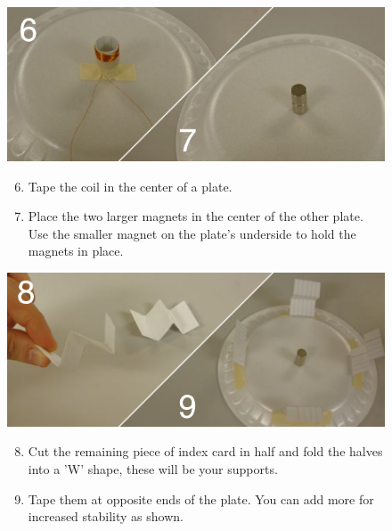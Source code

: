 \documentclass[11pt]{article}
\begin{document}
\begin{figure}[H]
	\begin{minipage}[b]{0.69\linewidth}
		\centering	\includegraphics[width=\textwidth]{images/plates.pdf}
	\end{minipage}
	\hspace{0.1cm}
	\begin{minipage}[b]{0.3\linewidth}
		\begin{enumerate} \setcounter{enumi}{5}
			\item Tape the coil in the center of a plate. 
			\item Place the two larger magnets in the center of the other plate. Use the smaller magnet on the plate's underside to hold 				the magnets in place.			
		\end{enumerate}
	\end{minipage}
\end{figure}

\vspace{1.6cm}

\begin{figure}[H]
	\begin{minipage}[b]{0.69\linewidth}
		\centering	\includegraphics[width=\textwidth]{images/spiders.pdf}
	\end{minipage}
	\hspace{0.1cm}
	\begin{minipage}[b]{0.3\linewidth}
		\begin{enumerate} \setcounter{enumi}{7}
			\item Cut the remaining piece of index card in half and fold the halves into a 'W' shape, these will be your supports.
			\item Tape them at opposite ends of the plate. You can add more for increased stability as shown.		
		\end{enumerate}
	\end{minipage}
\end{figure}
\end{document}
